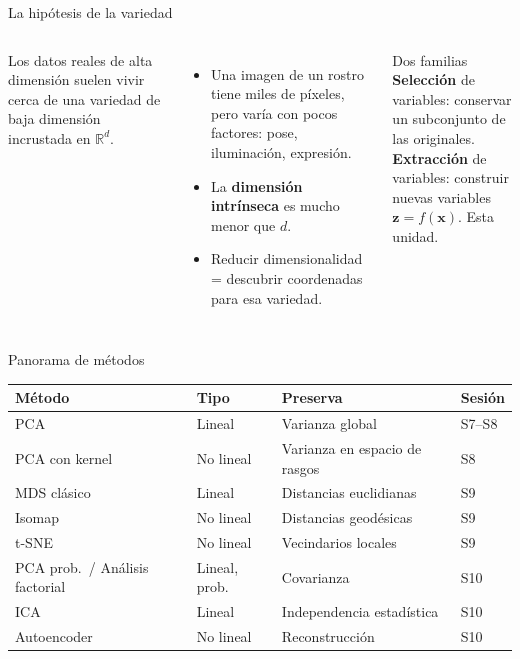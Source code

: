 \documentclass[aspectratio=169,11pt]{beamer}
\newcommand{\R}{\mathbb{R}}
\newcommand{\x}{\bm{x}}
\newcommand{\z}{\bm{z}}
\begin{document}
\begin{frame}{La hipótesis de la variedad}
  \begin{columns}[c]
    Los datos reales de alta dimensión suelen vivir cerca de una
    \alert{variedad de baja dimensión} incrustada en $\R^d$.
    \vspace{6pt}
    \begin{itemize}
      \item Una imagen de un rostro tiene miles de píxeles, pero varía con pocos factores: pose, iluminación, expresión.
      \item La \textbf{dimensión intrínseca} es mucho menor que $d$.
      \item Reducir dimensionalidad = descubrir coordenadas para esa variedad.
    \end{itemize}
    \begin{block}{Dos familias}
      \textbf{Selección} de variables: conservar un subconjunto de las originales.\\[4pt]
      \textbf{Extracción} de variables: construir nuevas variables
      $\z = f(\x)$. \alert{Esta unidad.}
    \end{block}
  \end{columns}
\end{frame}

\begin{frame}{Panorama de métodos}
  \centering
  \renewcommand{\arraystretch}{1.25}
  \begin{tabular}{@{}llll@{}}
    \toprule
    \textbf{Método} & \textbf{Tipo} & \textbf{Preserva} & \textbf{Sesión}\\
    \midrule
    PCA                    & Lineal          & Varianza global               & S7--S8 \\
    PCA con kernel         & No lineal       & Varianza en espacio de rasgos & S8 \\
    MDS clásico            & Lineal          & Distancias euclidianas        & S9 \\
    Isomap                 & No lineal       & Distancias geodésicas         & S9 \\
    t-SNE                  & No lineal       & Vecindarios locales           & S9 \\
    PCA prob.\ / Análisis factorial & Lineal, prob.   & Covarianza                    & S10 \\
    ICA                    & Lineal          & Independencia estadística     & S10 \\
    Autoencoder            & No lineal       & Reconstrucción                & S10 \\
    \bottomrule
  \end{tabular}
\end{frame}
\end{document}
